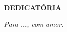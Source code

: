 \begin{dedicatoria}
\begin{center}
\textbf{DEDICATÓRIA}\\  
\end{center}

\vspace*{\fill}


\begin{flushright}
 \textit{Para ..., com amor.}
  

\end{flushright}


\end{dedicatoria}
